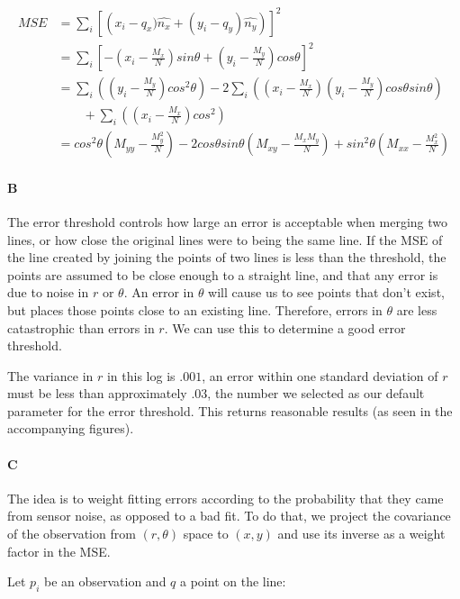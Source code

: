 \documentclass[12pt]{article}
\begin{document}
\begin{align*} MSE &=  \displaystyle\sum_i \left[\left(x_i - q_x)\hat{n_x} + (y_i - q_y)\hat{n_y}\right)\right]^2\\
&=\displaystyle\sum_i \left[-\left(x_i - \frac{M_x}{N}\right)sin\theta + \left(y_i - \frac{M_y}{N}\right)cos\theta\right]^2 \\
&=\displaystyle\sum_i \left(\left(y_i - \frac{M_y}{N}\right)cos^2\theta \right)
-2\displaystyle\sum_i \left(\left(x_i-\frac{M_x}{N}\right)\left(y_i - \frac{M_y}{N}\right)cos\theta sin\theta\right) \\
 &\qquad+ \displaystyle\sum_i \left(\left(x_i - \frac{M_x}{N}\right)cos^2\right) \\
&= cos^2\theta(M_{yy}-\frac{M_y^2}{N}) - 2cos\theta sin\theta(M_{xy}-\frac{M_xM_y}{N}) + sin^2\theta(M_{xx}-\frac{M_x^2}{N})
\end{align*}

\paragraph{B}
The error threshold controls how large an error is acceptable when merging
two lines, or how close the original lines were to being the same line.  If the
MSE of the line created by joining the points of two lines is less than the threshold,
the points are assumed to be close enough to a straight line, and that any error
is due to noise in $r$ or $\theta$.  An error in $\theta$ will cause us to see points
that don't exist, but places those points close to an existing line.  Therefore, errors in
$\theta$ are less catastrophic than errors in $r$.  We can use this to determine
a good error threshold.

The variance in $r$ in this log is $.001$, an error within one standard deviation
of $r$ must be less than approximately $.03$, the number we selected as our
default parameter for the error threshold.  This returns reasonable results (as seen
in the accompanying figures).

\paragraph{C}
The idea is to weight fitting errors according to the probability that they came from sensor noise, as opposed to a bad fit. To do that, we project the covariance of the observation from $(r,\theta)$ space to $(x,y)$ and use its inverse as a weight factor in the MSE.

Let $p_i$ be an observation and $q$ a point on the line:
\end{document}
